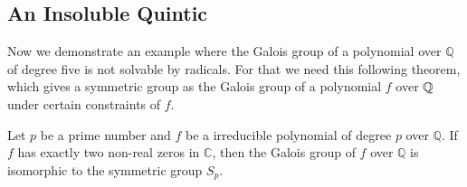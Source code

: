 %
%

\subsection{An Insoluble Quintic}

Now we demonstrate an example where the Galois group of a polynomial over $\mathbb Q$ of degree five is not solvable by radicals. For that we need this following theorem, which gives a symmetric group as the Galois group of a polynomial $f$ over $\mathbb Q$ under certain constraints of $f$. 

\begin{theorem} \label{thm:galois-iso-symmetric}
    Let $p$ be a prime number and $f$ be a irreducible polynomial of degree $p$ over $\mathbb Q$. If $f$ has exactly two non-real zeros in $\mathbb C$, then the Galois group of $f$ over $\mathbb Q$ is isomorphic to the symmetric group $S_p$.
\end{theorem}

